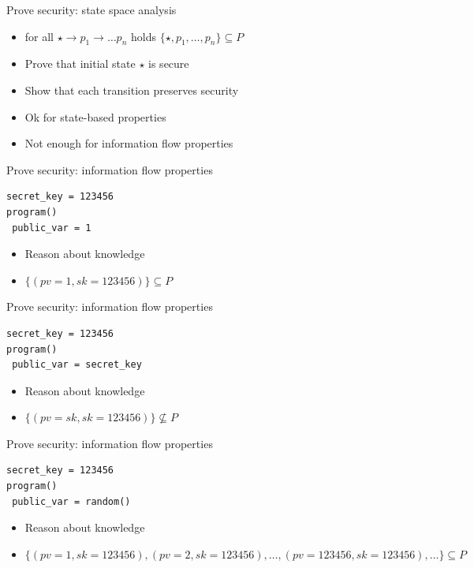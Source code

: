 \documentclass{beamer}
\begin{document}
\begin{frame}{Prove security: state space analysis}
  \begin{itemize}
  \item for all $\star \rightarrow p_1 \rightarrow \dots p_n$ holds
    $\{\star, p_1, \dots, p_n\} \subseteq P$
  \item Prove that initial state $\star$ is secure 
  \item Show that each transition preserves security
  \item<2-> Ok for state-based properties
  \item<2-> Not enough for information flow properties
  \end{itemize}
\end{frame}

\begin{frame}[fragile]{Prove security: information flow properties}
  \begin{verbatim}
secret_key = 123456
program()
 public_var = 1
  \end{verbatim}
  \begin{itemize}
  \item Reason about knowledge
  \item<2-> $\{(pv=1, sk=123456)\} \subseteq P$
  \end{itemize}
\end{frame}

\begin{frame}[fragile]{Prove security: information flow properties}
  \begin{verbatim}
secret_key = 123456
program()
 public_var = secret_key
  \end{verbatim}
  \begin{itemize}
  \item Reason about knowledge
  \item<2-> $\{(pv=sk, sk=123456)\} \not \subseteq P$
  \end{itemize}
\end{frame}

\begin{frame}[fragile]{Prove security: information flow properties}
  \begin{verbatim}
secret_key = 123456
program()
 public_var = random()
  \end{verbatim}
  \begin{itemize}
  \item Reason about knowledge
  \item<2-> $\{(pv=1, sk=123456), (pv=2, sk=123456), \dots ,
    (pv=123456, sk=123456), \dots\} \subseteq P$
  \end{itemize}
\end{frame}
\end{document}
